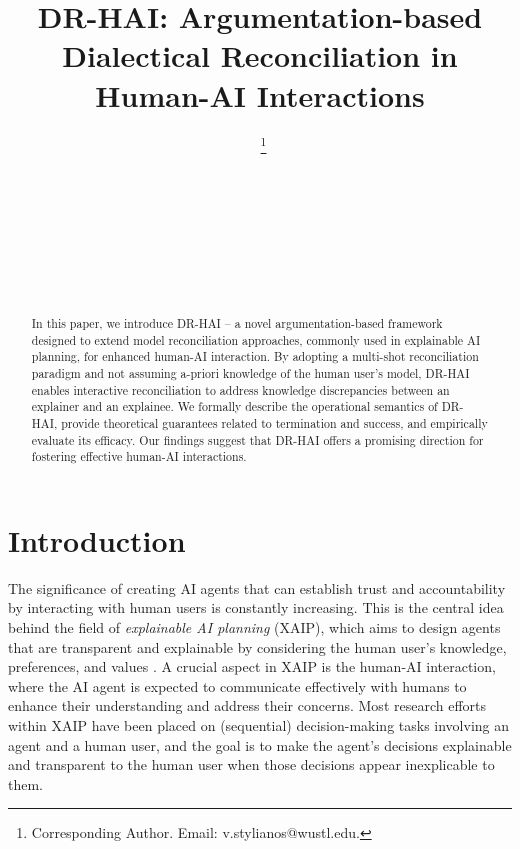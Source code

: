 \documentclass{ecai}
\begin{document}
\sloppy
\allowdisplaybreaks

\begin{frontmatter}
\title{\textsc{DR-HAI}: Argumentation-based Dialectical Reconciliation in Human-AI Interactions}


 \author[A]{~\thanks{Corresponding Author. Email: v.stylianos@wustl.edu.}}
 \author[A]{~}
 \author[A]{~} 
 \author[B]{~} 
 \author[C]{~} 

 \address[A]{Washington University in St. Louis}
 \address[B]{New Mexico State University}
  \address[C]{Imperial College London}


\begin{abstract}
In this paper, we introduce DR-HAI -- a novel argumentation-based framework designed to extend model reconciliation approaches, commonly used in explainable AI planning, for enhanced human-AI interaction. By adopting a multi-shot reconciliation paradigm and not assuming a-priori knowledge of the human user's model, DR-HAI enables interactive reconciliation to address knowledge discrepancies between an explainer and an explainee. We formally describe the operational semantics of DR-HAI, provide theoretical guarantees related to termination and success, and empirically evaluate its efficacy. Our findings suggest that DR-HAI offers a promising direction for fostering effective human-AI interactions.
\end{abstract}

\end{frontmatter}





\section{Introduction}

The significance of creating AI agents that can establish trust and accountability by interacting with human users is constantly increasing. This is the central idea behind the field of \emph{explainable AI planning} (XAIP), which aims to design agents that are transparent and explainable by considering the human user's knowledge, preferences, and values \cite{sreedharan2022explainable}. A crucial aspect in XAIP is the human-AI interaction, where the AI agent is expected to communicate effectively with humans to enhance their understanding and address their concerns. Most research efforts within XAIP have been placed on (sequential) decision-making tasks involving an agent and a human user, and the goal is to make the agent's decisions explainable and transparent to the human user when those decisions appear inexplicable to them.
\end{document}

